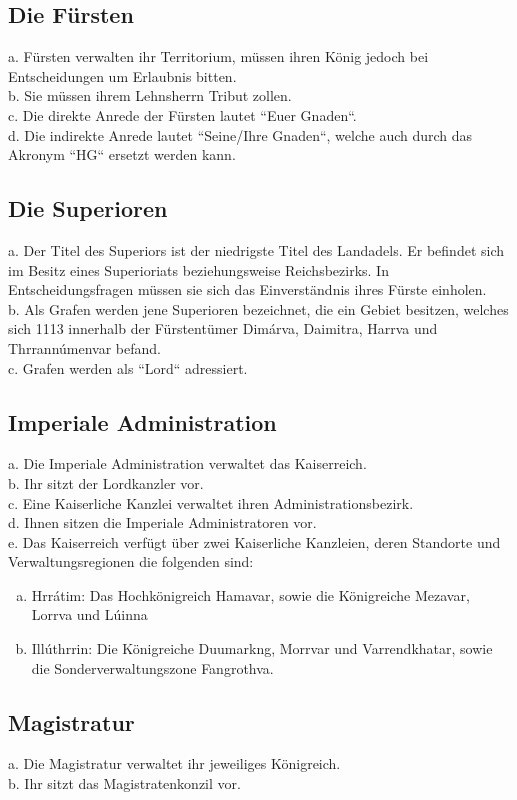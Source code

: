 \documentclass{article}
\begin{document}
\subsection{Die Fürsten}
a. Fürsten verwalten ihr Territorium, müssen ihren König jedoch bei Entscheidungen um Erlaubnis bitten.  \\
b. Sie müssen ihrem Lehnsherrn Tribut zollen.  \\
c. Die direkte Anrede der Fürsten lautet ``Euer Gnaden``. \\
d. Die indirekte Anrede lautet ``Seine/Ihre Gnaden``, welche auch durch das Akronym ``HG`` ersetzt werden kann.  

\subsection{Die Superioren}
a. Der Titel des Superiors ist der niedrigste Titel des Landadels. Er befindet sich im Besitz eines Superioriats beziehungsweise Reichsbezirks. In Entscheidungsfragen müssen sie sich das Einverständnis ihres Fürste einholen.  \\
b. Als Grafen werden jene Superioren bezeichnet, die ein Gebiet besitzen, welches sich 1113 innerhalb der Fürstentümer Dimárva, Daimitra, Harrva und Thrrannúmenvar befand.  \\
c. Grafen werden als ``Lord`` adressiert.  

\subsection{Imperiale Administration}
a. Die Imperiale Administration verwaltet das Kaiserreich.  \\
b. Ihr sitzt der Lordkanzler vor.  \\
c. Eine Kaiserliche Kanzlei verwaltet ihren Administrationsbezirk.  \\
d. Ihnen sitzen die Imperiale Administratoren vor.  \\
e. Das Kaiserreich verfügt über zwei Kaiserliche Kanzleien, deren Standorte und Verwaltungsregionen die folgenden sind:  
\begin{enumerate}[a)]
\item Hrrátim: Das Hochkönigreich Hamavar, sowie die Königreiche Mezavar, Lorrva und Lúinna  
\item Illúthrrin: Die Königreiche Duumarkng, Morrvar und Varrendkhatar, sowie die Sonderverwaltungszone Fangrothva.
\end{enumerate}

\subsection{Magistratur}
a. Die Magistratur verwaltet ihr jeweiliges Königreich.  \\
b. Ihr sitzt das Magistratenkonzil vor.
\end{document}
